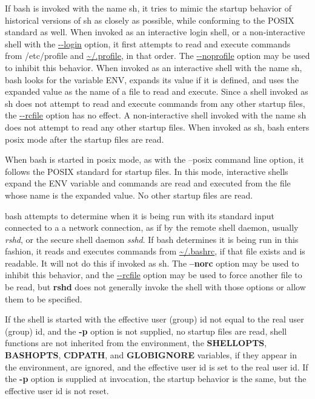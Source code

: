 If \gls{bash} is invoked with the name sh, it tries to mimic the startup behavior of historical versions of sh as closely as possible, while conforming to the  \gls{POSIX} standard as well. When invoked as an interactive login shell, or a non-interactive shell with the \url{--login} option, it first attempts to read and execute commands from /etc/profile and \url{~/.profile}, in that order. The \url{--noprofile} option may be used to inhibit this behavior. When invoked as an interactive shell with the name sh, \gls{bash} looks for the variable ENV, expands its value if it is defined, and uses the expanded value as the name of a file to read and execute. Since a shell invoked as sh does not attempt to read and execute commands from any other startup files, the \url{--rcfile} option has no effect. A non-interactive shell invoked with the name sh does not attempt to read any other startup files. When invoked as sh, \gls{bash} enters posix mode after the startup files are read.

When \gls{bash} is started in posix mode, as with the --posix command line option, it follows the  \gls{POSIX} standard for startup files. In this mode, interactive shells expand the \gls{ENV} variable and commands are read and executed from the file whose name is the expanded value. No other startup files are read.

\Gls{bash} attempts to determine when it is being run with its standard input connected to a a network connection, as if by the remote shell daemon, usually \textit{rshd}, or the secure shell daemon \textit{sshd}. If \gls{bash} determines it is being run in this fashion, it reads and executes commands from \url{~/.bashrc}, if that file exists and is readable. It will not do this if invoked as sh. The \textbf{--norc} option may be used to inhibit this behavior, and the \url{--rcfile} option may be used to force another file to be read, but \textbf{rshd} does not generally invoke the shell with those options or allow them to be specified.

If the shell is started with the effective user (group) id not equal to the real user (group) id, and the \textbf{-p} option is not supplied, no startup files are read, shell functions are not inherited from the environment, the \textbf{SHELLOPTS}, \textbf{BASHOPTS}, \textbf{CDPATH}, and \textbf{GLOBIGNORE} variables, if they appear in the environment, are ignored, and the effective user id is set to the real user id. If the \textbf{-p} option is supplied at invocation, the startup behavior is the same, but the effective user id is not reset.